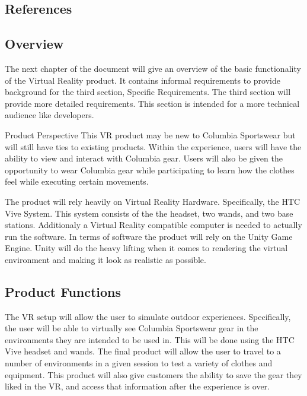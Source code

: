 \documentclass[10pt,journal,compsoc,onecolumn]{IEEEtran}
\begin{document}
\subsection{References}
\begingroup
\renewcommand{\section}[2]{}%


\endgroup

\subsection{Overview}
The next chapter of the document will give an overview of the basic functionality
of the Virtual Reality product. It contains informal requirements to provide
background for the third section, Specific Requirements. The third section
will provide more detailed requirements. This section is intended for a more
technical audience like developers.

\section{Overall Description}
\subsection{Product Perspective}
This VR product may be new to Columbia Sportswear but will still have ties to
existing products. Within the experience, users will have the ability to view
and interact with Columbia gear. Users will also be given the opportunity to
wear Columbia gear while participating to learn how the clothes feel while
executing certain movements.

The product will rely heavily on Virtual Reality Hardware.
Specifically, the HTC Vive System. This system consists of the the headset, two
wands, and two base stations. Additionaly a Virtual Reality compatible computer is needed to actually run the software. In terms of software the
product will rely on the Unity Game Engine. Unity will do the heavy lifting
when it comes to rendering the virtual environment and making it look as realistic as possible.

\subsection{Product Functions}
The VR setup will allow the user to simulate outdoor experiences.
Specifically, the user will be able to virtually see Columbia Sportswear
gear in the environments they are intended to be used in.
This will be done using the HTC Vive headset and wands. The final product
will allow the user to travel to a number of environments in a given session to
test a variety of clothes and equipment. This product will also give customers
the ability to save the gear they liked in the VR, and access that information after the experience is over.
\end{document}

